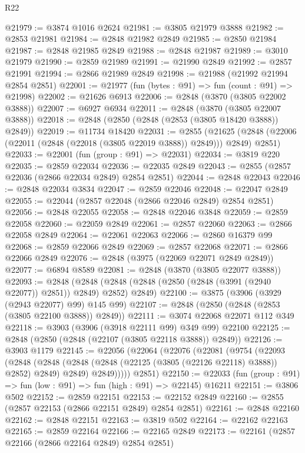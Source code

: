 \begin{lexlean}{R22}
\begin{coremodule}
@21979 := @3874 @1016 @2624
@21981 := @3805 @21979 @3888
@21982 := @2853 @21981
@21984 := @2848 @21982 @2849
@21985 := @2850 @21984
@21987 := @2848 @21985 @2849
@21988 := @2848 @21987
@21989 := @3010 @21979
@21990 := @2859 @21989
@21991 := @21990 @2849
@21992 := @2857 @21991
@21994 := @2866 @21989 @2849
@21998 := @21988 (@21992 @21994 @2854 @2851)
@22001 := @21977 (fun (bytes : @91) => fun (count : @91) => @21998)
@22002 := @21626 @6913
@22006 := @2848 (@3870 (@3805 @22002 @3888))
@22007 := @6927 @6934
@22011 := @2848 (@3870 (@3805 @22007 @3888))
@22018 := @2848 (@2850 (@2848 (@2853 (@3805 @18420 @3888)) @2849))
@22019 := @11734 @18420
@22031 := @2855
    (@21625 (@2848 (@22006 (@22011 (@2848 (@22018 (@3805 @22019 @3888)) @2849))) @2849) @2851)
@22033 := @22001 (fun (group : @91) => @22031)
@22034 := @3819 @220
@22035 := @2859 @22034
@22036 := @22035 @2849
@22043 := @2855 (@2857 @22036 (@2866 @22034 @2849) @2854 @2851)
@22044 := @2848 @22043
@22046 := @2848 @22034 @3834
@22047 := @2859 @22046
@22048 := @22047 @2849
@22055 := @22044 (@2857 @22048 (@2866 @22046 @2849) @2854 @2851)
@22056 := @2848 @22055
@22058 := @2848 @22046 @3848
@22059 := @2859 @22058
@22060 := @22059 @2849
@22061 := @2857 @22060
@22063 := @2866 @22058 @2849
@22064 := @22061 @22063
@22066 := @2860 @16379 @99
@22068 := @2859 @22066 @2849
@22069 := @2857 @22068
@22071 := @2866 @22066 @2849
@22076 := @2848 (@3975 (@22069 @22071 @2849 @2849))
@22077 := @6894 @8589
@22081 := @2848 (@3870 (@3805 @22077 @3888))
@22093 := @2848
    (@2848 (@2848 (@2848 (@2850 (@2848 (@3991 (@2940 @22077)) @2851)) @2849) @2852) @2849)
@22100 := @3875 (@3906 (@3929 (@2943 @22077) @99) @145 @99)
@22107 := @2848 (@2850 (@2848 (@2853 (@3805 @22100 @3888)) @2849))
@22111 := @3074 @22068 @22071 @112 @349
@22118 := @3903 (@3906 (@3918 @22111 @99) @349 @99) @22100
@22125 := @2848 (@2850 (@2848 (@22107 (@3805 @22118 @3888)) @2849))
@22126 := @3903 @1179
@22145 := @22056
    (@22064
      (@22076
        (@22081
          (@9754
            (@22093
              (@2848
                (@2848 (@2848 (@2848 (@22125 (@3805 (@22126 @22118) @3888)) @2852) @2849) @2849)
                @2849)))))
      @2851)
@22150 := @22033 (fun (group : @91) => fun (low : @91) => fun (high : @91) => @22145) @16211
@22151 := @3806 @502
@22152 := @2859 @22151
@22153 := @22152 @2849
@22160 := @2855 (@2857 @22153 (@2866 @22151 @2849) @2854 @2851)
@22161 := @2848 @22160
@22162 := @2848 @22151
@22163 := @3819 @502
@22164 := @22162 @22163
@22165 := @2859 @22164
@22166 := @22165 @2849
@22173 := @22161 (@2857 @22166 (@2866 @22164 @2849) @2854 @2851)

\end{coremodule}
\end{lexlean}

